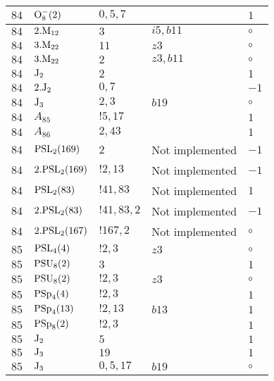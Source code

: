 \documentclass[a4paper, 11pt]{article}
\begin{document}
\begin{longtable}{lllll}
        $ 84 $ & $ {\rm O}_{8}^-(2) $ & $ 0,5,7 $ & $ ~ $ & $ 1$ \\ \hline
        $ 84 $ & $ 2.{\rm M}_{12} $ & $ 3 $ & $ i5, b11 $ &  $\circ$ \\ \hline
        $ 84 $ & $ 3.{\rm M}_{22} $ & $ 11 $ & $ z3 $ &  $\circ$ \\ \hline
        $ 84 $ & $ 3.{\rm M}_{22} $ & $ 2 $ & $ z3, b11 $ &  $\circ$ \\ \hline
        $ 84 $ & $ {\rm J}_2 $ & $ 2 $ & $ ~ $ & $ 1$ \\ \hline
        $ 84 $ & $ 2.{\rm J}_2 $ & $ 0,7 $ & $ ~ $ & $ -1$ \\ \hline
        $ 84 $ & $ {\rm J}_3 $ & $ 2,3 $ & $ b19 $ &  $\circ$ \\ \hline
        $ 84 $ & $ A_{85} $ & $ !5, 17 $ & $ ~ $ & $ 1$ \\ \hline
        $ 84 $ & $ A_{86} $ & $ 2, 43 $ & $ ~ $ & $ 1$ \\ \hline
        $ 84 $ & $ {\rm PSL}_{2}(169) $ & $ 2 $ &  Not implemented & $ -1$ \\ \hline
        $ 84 $ & $ 2.{\rm PSL}_{2}(169) $ & $ !2, 13 $ &  Not implemented & $ -1$ \\ \hline
        $ 84 $ & $ {\rm PSL}_{2}(83) $ & $ !41, 83 $ &  Not implemented & $ 1$ \\ \hline
        $ 84 $ & $ 2.{\rm PSL}_{2}(83) $ & $ !41, 83, 2 $ &  Not implemented & $ -1$ \\ \hline
        $ 84 $ & $ 2.{\rm PSL}_{2}(167) $ & $ !167, 2 $ &  Not implemented &  $\circ$ \\ \hline
        $ 85 $ & $ {\rm PSL}_{4}(4) $ & $ ! 2,3 $ & $ z3 $ &  $\circ$ \\ \hline
        $ 85 $ & $ {\rm PSU}_{8}(2) $ & $ 3 $ & $ ~ $ & $ 1$ \\ \hline
        $ 85 $ & $ {\rm PSU}_{8}(2) $ & $ ! 2,3 $ & $ z3 $ &  $\circ$ \\ \hline
        $ 85 $ & $ {\rm PSp}_{4}(4) $ & $ ! 2,3 $ & $ ~ $ & $ 1$ \\ \hline
        $ 85 $ & $ {\rm PSp}_{4}(13) $ & $ ! 2,13 $ & $ b13 $ & $ 1$ \\ \hline
        $ 85 $ & $ {\rm PSp}_{8}(2) $ & $ ! 2,3 $ & $ ~ $ & $ 1$ \\ \hline
        $ 85 $ & $ {\rm J}_2 $ & $ 5 $ & $ ~ $ & $ 1$ \\ \hline
        $ 85 $ & $ {\rm J}_3 $ & $ 19 $ & $ ~ $ & $ 1$ \\ \hline
        $ 85 $ & $ {\rm J}_3 $ & $ 0,5,17 $ & $ b19 $ &  $\circ$ \\ \hline

\end{longtable}
\end{document}
